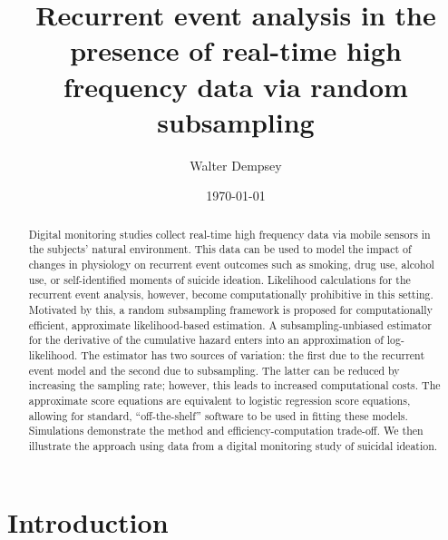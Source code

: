 \documentclass[11pt]{amsart}
\begin{document}
\title[Recurrent event analysis with functional covariates via random subsampling]{Recurrent event analysis in the presence of real-time high frequency data via random subsampling}
\author{Walter Dempsey}
\address {Department of Biostatistics, University of Michigan, 1415 Washington Heights, Ann Arbor, MI 48109, USA}

\date{\today}

\begin{abstract}
Digital monitoring studies collect real-time high frequency data via mobile sensors in the subjects' natural environment. This data can be used to model the impact of changes in physiology on recurrent event outcomes such as smoking, drug use, alcohol use, or self-identified moments of suicide ideation. Likelihood calculations for the recurrent event analysis, however, become computationally prohibitive in this setting. Motivated by this, a random subsampling framework is proposed for computationally efficient, approximate likelihood-based estimation. A subsampling-unbiased estimator for the derivative of the cumulative hazard enters into an approximation of log-likelihood. The estimator has two sources of variation: the first due to the recurrent event model and the second due to subsampling. The latter can be reduced by increasing the sampling rate; however, this leads to increased computational costs.  The approximate score equations are equivalent to logistic regression score equations, allowing for standard, ``off-the-shelf'' software to be used in fitting these models. Simulations demonstrate the method and efficiency-computation trade-off. We then illustrate the approach using data from a digital monitoring study of suicidal ideation.
\end{abstract}



\maketitle

\section{Introduction}
\end{document}
